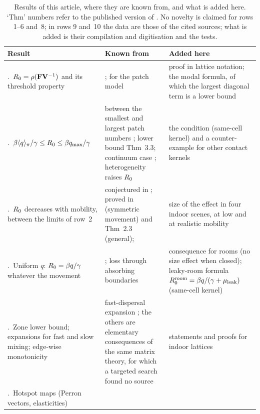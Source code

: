 \begin{table}[tbp]
\centering\small
\caption{Results of this article, where they are known from, and what is added here. `Thm' numbers refer
to the published version of \citet{gao2020fast}. No novelty is claimed for rows 1--6 and~8; in rows 9
and~10 the data are those of the cited sources; what is added is their compilation and digitisation and the
tests.}
\label{s1_intro:tab:known}
\begin{tabular}{@{}>{\raggedright\arraybackslash}p{}>{\raggedright\arraybackslash}p{}>{\raggedright\arraybackslash}p{}@{}}
\toprule
Result & Known from & Added here \\
\midrule
1.\ $R_0=\rho(\mathbf{F}\mathbf{V}^{-1})$ and its threshold property &
  \citep{diekmann1990definition,vandendriessche2002reproduction}; for the patch model
  \citep{allen2007asymptotic} &
  proof in lattice notation; the modal formula, of which the largest diagonal term is a lower bound \\\addlinespace[2pt]
2.\ $\beta\langle q\rangle_{\pi}/\gamma\le R_0\le\beta q_{\max}/\gamma$ &
  between the smallest and largest patch numbers \citep{gao2011sis}; lower bound \citep{gao2020fast} Thm~3.3;
  continuum case \citep{allen2008asymptotic}; heterogeneity raises $R_0$ \citep{hasibeder1988population} &
  the condition (same-cell kernel) and a counter-example for other contact kernels \\\addlinespace[2pt]
3.\ $R_0$ decreases with mobility, between the limits of row~2 &
  conjectured in \citep{allen2007asymptotic}; proved in \citep{gao2019travel} (symmetric movement) and
  \citep{gao2020fast} Thm~2.3 (general); \citep{chen2020asymptotic,altenberg2012resolvent} &
  size of the effect in four indoor scenes, at low and at realistic mobility \\\addlinespace[2pt]
4.\ Uniform $q$: $R_0=\beta q/\gamma$ whatever the movement &
  \citep{gao2011sis}; loss through absorbing boundaries \citep{skellam1951random,cantrell2003spatial} &
  consequence for rooms (no size effect when closed); leaky-room formula $R_0^{\mathrm{room}}=\beta q/(\gamma+\mu_{\mathrm{leak}})$
  (same-cell kernel) \\\addlinespace[2pt]
5.\ Zone lower bound; expansions for fast and slow mixing; edge-wise monotonicity &
  fast-dispersal expansion \citep{tien2015disease}; the others are elementary consequences of the same matrix
  theory, for which a targeted search found no source &
  statements and proofs for indoor lattices \\\addlinespace[2pt]
6.\ Hotspot maps (Perron vectors, elasticities) &

\end{tabular}
\end{table}
